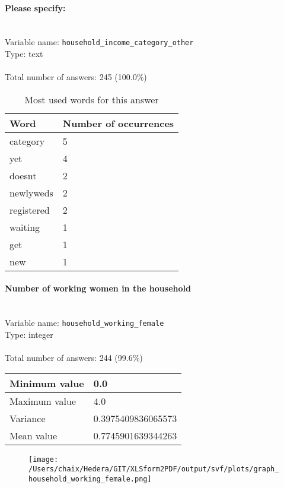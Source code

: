 \documentclass[11.5pt, a4paper]{scrartcl}
\begin{document}
\paragraph{Please specify:}
\  \\Variable name: \texttt{household\_income\_category\_other}\\
Type: text\\
\\Total number of answers: 245 (100.0\%)
\\[0.2em]\begin{table}[H]
 \begin{tabular}{p{4cm}|p{8cm}}
Word & Number of occurrences  \\
\hline
\cellcolor{mygray}category&\cellcolor{mygray}5\\
\hline
yet&4\\
\hline
\cellcolor{mygray}doesnt&\cellcolor{mygray}2\\
\hline
newlyweds&2\\
\hline
\cellcolor{mygray}registered&\cellcolor{mygray}2\\
\hline
waiting&1\\
\hline
\cellcolor{mygray}get&\cellcolor{mygray}1\\
\hline
new&1\\
\hline
\end{tabular}
\caption{\label{tab:table-name} Most used words for this answer}
\end{table}
\paragraph{Number of working women in the household}
\  \\Variable name: \texttt{household\_working\_female}\\
Type: integer\\
\\Total number of answers: 244 (99.6\%)
\\[0.2em] \begin{tabular}{p{4cm}|p{8cm}}
Minimum value &0.0 \\
\hline
\cellcolor{mygray} Maximum value & \cellcolor{mygray}4.0 \\
\hline
Variance &0.3975409836065573 \\
\hline
\cellcolor{mygray} Mean value & \cellcolor{mygray}0.7745901639344263 \\
\hline
\end{tabular}
\begin{figure}[H]
\centering
\texttt{[image: /Users/chaix/Hedera/GIT/XLSform2PDF/output/svf/plots/graph\_household\_working\_female.png]}
\end{figure}
\end{document}
